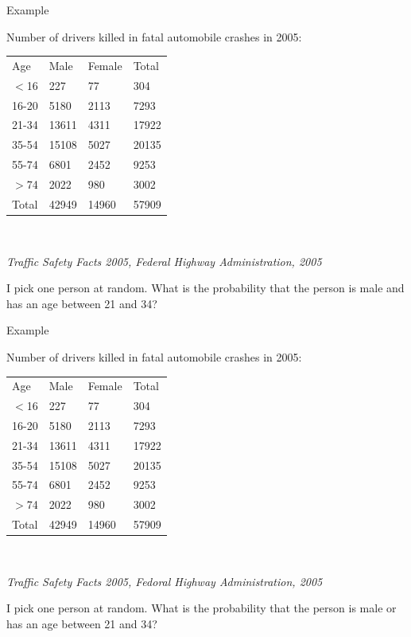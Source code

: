 \begin{frame}{Example}

  Number of drivers killed in fatal automobile crashes in 2005: \\
  \begin{tabular}{llll}
    Age & Male & Female & Total \\
    $<$16 & 227 & 77 & 304 \\
    16-20 & 5180 & 2113 & 7293 \\
    21-34 & 13611 & 4311 & 17922 \\
    35-54 & 15108 & 5027 & 20135 \\
    55-74 & 6801 & 2452 & 9253 \\
    $>$74   & 2022 & 980 & 3002 \\
    Total & 42949 & 14960 & 57909 
  \end{tabular} \\

  \vfill

  \textit{Traffic Safety Facts 2005, Federal Highway Administration,
    2005}

  \vfill

  I pick one person at random. What is the probability that the person
  is male and has an age between 21 and 34?

  
  
\end{frame}


\begin{frame}{Example}

  Number of drivers killed in fatal automobile crashes in 2005: \\
  \begin{tabular}{llll}
    Age & Male & Female & Total \\
    $<$16 & 227 & 77 & 304 \\
    16-20 & 5180 & 2113 & 7293 \\
    21-34 & 13611 & 4311 & 17922 \\
    35-54 & 15108 & 5027 & 20135 \\
    55-74 & 6801 & 2452 & 9253 \\
    $>$74   & 2022 & 980 & 3002 \\
    Total & 42949 & 14960 & 57909 
  \end{tabular} \\

  \vfill

  \textit{Traffic Safety Facts 2005, Fedoral Highway Administration,
    2005}

  \vfill

  I pick one person at random. What is the probability that the person
  is male or has an age between 21 and 34?

  
  
\end{frame}


